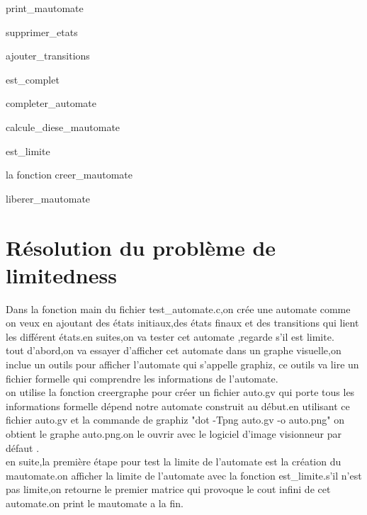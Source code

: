 \documentclass{report}
\begin{document}
print\_mautomate

supprimer\_etats

ajouter\_transitions

est\_complet

completer\_automate

calcule\_diese\_mautomate

est\_limite

la fonction creer\_mautomate 

liberer\_mautomate




\chapter{Résolution du problème de limitedness}

Dans la fonction main du fichier test_automate.c,on crée une automate comme on veux en ajoutant des états initiaux,des états finaux et des transitions qui lient les différent états.en suites,on va tester cet automate ,regarde s'il est limite.\\

tout d'abord,on va essayer d'afficher cet automate dans un graphe visuelle,on inclue un outils pour afficher l'automate qui s'appelle  graphiz, ce outils va lire un fichier formelle qui comprendre les informations de l'automate.\\

on utilise la fonction creergraphe pour créer un fichier auto.gv qui porte tous les informations formelle dépend notre automate construit au début.en utilisant ce fichier auto.gv et la commande de graphiz "dot -Tpng auto.gv -o auto.png" on obtient le graphe auto.png.on le ouvrir avec le logiciel  d'image visionneur par défaut .\\

en suite,la première étape pour test la limite de l'automate est la création du mautomate.on afficher la limite de l'automate avec la fonction est\_limite.s'il n'est pas limite,on retourne le premier matrice qui provoque le cout infini de cet automate.on print le mautomate a la fin.\\




\end{document}
